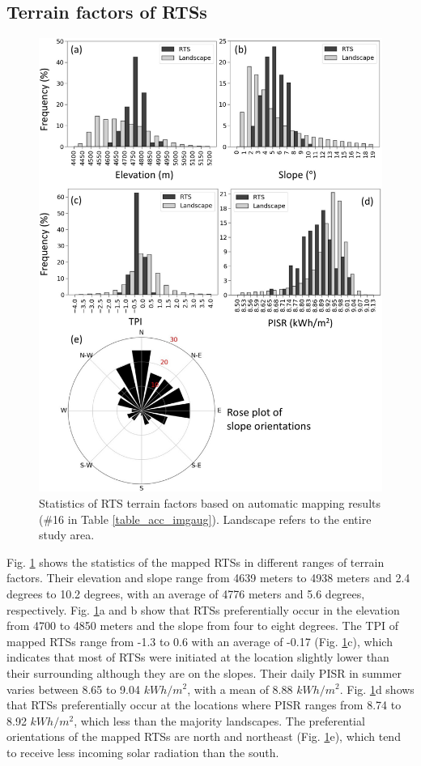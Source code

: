 \documentclass[preprint,12pt,authoryear]{elsarticle}
\begin{document}
\subsection{Terrain factors of RTSs}
\label{subsec_terrain}

\begin{figure}
	\centering
	\includegraphics[width=13cm]{figures/terrain_var_fig_mapped_trim.jpg}
	\caption{Statistics of RTS terrain factors based on automatic mapping results  (\#16 in Table \ref{table_acc_imgaug}). Landscape refers to the entire study area.}
	\label{fig_terrain_factors}
\end{figure}

Fig. \ref{fig_terrain_factors} shows the statistics of the mapped RTSs in different ranges of terrain factors. Their elevation and slope range from 4639 meters to 4938 meters and 2.4 degrees to 10.2 degrees, with an average of 4776 meters and 5.6 degrees, respectively. Fig. \ref{fig_terrain_factors}a and b show that RTSs preferentially occur in the elevation from 4700 to 4850 meters and the slope from four to eight degrees. The TPI of mapped RTSs range from -1.3 to 0.6 with an average of -0.17 (Fig. \ref{fig_terrain_factors}c), which indicates that most of RTSs were initiated at the location slightly lower than their surrounding although they are on the slopes. Their daily PISR in summer varies between 8.65 to 9.04 $kWh/m^2$, with a mean of 8.88 $kWh/m^2$. Fig. \ref{fig_terrain_factors}d shows that RTSs preferentially occur at the locations where PISR ranges from 8.74 to 8.92 $kWh/m^2$, which less than the majority landscapes. The preferential orientations of the mapped RTSs are north and northeast (Fig. \ref{fig_terrain_factors}e), which tend to receive less incoming solar radiation than the south. 
\end{document}

